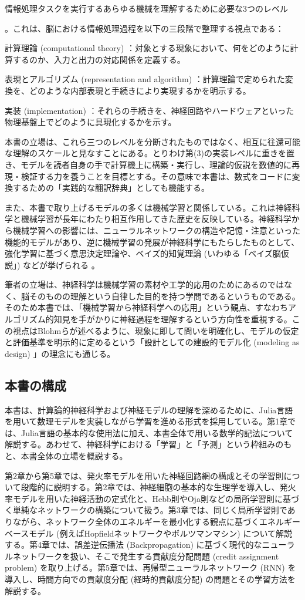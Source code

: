 \documentclass[titlepage]{ltjsbook}
\begin{document}
情報処理タスクを実行するあらゆる機械を理解するために必要な3つのレベル


。これは、脳における情報処理過程を以下の三段階で整理する視点である：

計算理論 (computational theory) ：対象とする現象において、何をどのように計算するのか、入力と出力の対応関係を定義する。

表現とアルゴリズム (representation and algorithm) ：計算理論で定められた変換を、どのような内部表現と手続きにより実現するかを明示する。

実装 (implementation) ：それらの手続きを、神経回路やハードウェアといった物理基盤上でどのように具現化するかを示す。

本書の立場は、これら三つのレベルを分断されたものではなく、相互に往還可能な理解のスケールと見なすことにある。とりわけ第(3)の実装レベルに重きを置き、モデルを読者自身の手で計算機上に構築・実行し、理論的仮説を数値的に再現・検証する力を養うことを目標とする。その意味で本書は、数式をコードに変換するための「実践的な翻訳辞典」としても機能する。

また、本書で取り上げるモデルの多くは機械学習と関係している。これは神経科学と機械学習が長年にわたり相互作用してきた歴史を反映している。神経科学から機械学習への影響には、ニューラルネットワークの構造や記憶・注意といった機能的モデルがあり、逆に機械学習の発展が神経科学にもたらしたものとして、強化学習に基づく意思決定理論や、ベイズ的知覚理論 (いわゆる「ベイズ脳仮説」) などが挙げられる \citep{Hassabis2017-zm}。

筆者の立場は、神経科学は機械学習の素材や工学的応用のためにあるのではなく、脳そのものの理解という自律した目的を持つ学問であるというものである。そのため本書では、「機械学習から神経科学への応用」という観点、すなわちアルゴリズム的知見を手がかりに神経過程を理解するという方向性を重視する。この視点はBlohmらが述べるように、現象に即して問いを明確化し、モデルの仮定と評価基準を明示的に定めるという「設計としての建設的モデル化 (modeling as design) 」の理念にも通じる。

\subsection{本書の構成}
本書は、計算論的神経科学および神経モデルの理解を深めるために、Julia言語を用いて数理モデルを実装しながら学習を進める形式を採用している。第1章では、Julia言語の基本的な使用法に加え、本書全体で用いる数学的記法について解説する。あわせて、神経科学における「学習」と「予測」という枠組みのもと、本書全体の立場を概説する。

第2章から第5章では、発火率モデルを用いた神経回路網の構成とその学習則について段階的に説明する。第2章では、神経細胞の基本的な生理学を導入し、発火率モデルを用いた神経活動の定式化と、Hebb則やOja則などの局所学習則に基づく単純なネットワークの構築について扱う。第3章では、同じく局所学習則でありながら、ネットワーク全体のエネルギーを最小化する観点に基づくエネルギーベースモデル (例えばHopfieldネットワークやボルツマンマシン) について解説する。第4章では、誤差逆伝播法 (Backpropagation) に基づく現代的なニューラルネットワークを扱い、そこで発生する貢献度分配問題 (credit assignment problem) を取り上げる。第5章では、再帰型ニューラルネットワーク (RNN) を導入し、時間方向での貢献度分配 (経時的貢献度分配) の問題とその学習方法を解説する。
\end{document}
